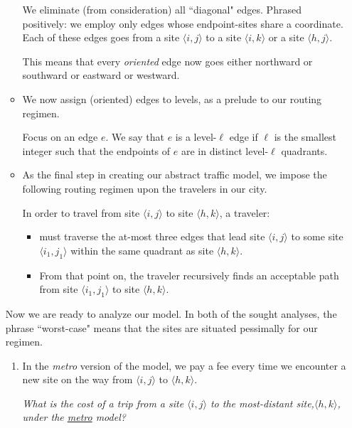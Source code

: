\begin{enumerate}
\begin{itemize}
\smallskip

We eliminate (from consideration) all ``diagonal" edges.  Phrased positively: we employ only edges whose endpoint-sites share a coordinate.  Each of these edges goes from a site $\langle i,j \rangle$ to a site $\langle i,k \rangle$ or a site $\langle h,j \rangle$.

\smallskip

This means that every {\em oriented} edge now goes either northward or southward or eastward or westward.

\medskip\item
We now assign (oriented) edges to levels, as a prelude to our routing regimen.

\smallskip

Focus on an edge $e$.  We say that $e$ is a level-$\ell$ edge if $\ell$ is the smallest integer such that the endpoints of $e$ are in distinct level-$\ell$ quadrants.

  \medskip\item
As the final step in creating our abstract traffic model, we impose the following routing regimen upon the travelers in our city.

\smallskip

In order to travel from site $\langle i,j \rangle$ to site $\langle h,k \rangle$, a traveler:
    \begin{itemize}
    \item
must traverse the at-most three edges that lead site $\langle i,j \rangle$ to some site $\langle i_1,j_1 \rangle$ within the same quadrant as site $\langle h,k \rangle$.

   \medskip\item
From that point on, the traveler recursively finds an acceptable path from site $\langle i_1,j_1 \rangle$ to site $\langle h,k \rangle$.
    \end{itemize}
  \end{itemize}

Now we are ready to analyze our model.  
In both of the sought analyses, the phrase ``worst-case" means that the sites are situated pessimally for our regimen.
  \begin{enumerate}
  \item
In the {\em metro} version of the model, we pay a fee every time we encounter a new site on the way from $\langle i,j \rangle$ to $\langle h,k \rangle$.

\smallskip

{\em What is the cost of a trip from a site $\langle i,j \rangle$ to the most-distant site,$\langle h,k \rangle$, under the \underline{metro} model?}


\end{enumerate}
\end{enumerate}
